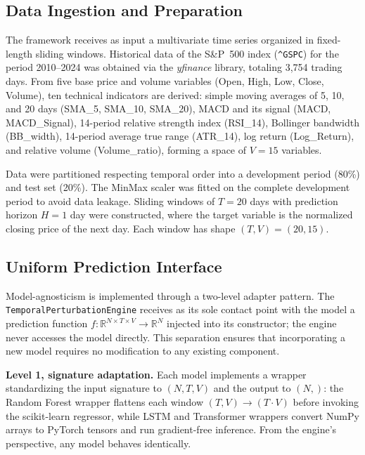 \documentclass[runningheads]{llncs}
\begin{document}
\subsection{Data Ingestion and Preparation}

The framework receives as input a multivariate time series
organized in fixed-length sliding windows. Historical data of the
S\&P~500 index (\texttt{\^{}GSPC}) for the period 2010--2024 was
obtained via the \textit{yfinance} library, totaling 3,754 trading
days. From five base price and volume variables (Open, High, Low,
Close, Volume), ten technical indicators are derived: simple moving
averages of 5, 10, and 20 days (SMA\_5, SMA\_10, SMA\_20), MACD
and its signal (MACD, MACD\_Signal), 14-period relative strength
index (RSI\_14), Bollinger bandwidth (BB\_width), 14-period average
true range (ATR\_14), log return (Log\_Return), and relative volume
(Volume\_ratio), forming a space of $V=15$ variables.

Data were partitioned respecting temporal order into a development
period (80\%) and test set (20\%). The MinMax scaler was fitted on
the complete development period to avoid data leakage. Sliding
windows of $T=20$ days with prediction horizon $H=1$ day were
constructed, where the target variable is the normalized closing
price of the next day. Each window has shape $(T, V) = (20, 15)$.

\subsection{Uniform Prediction Interface}

Model-agnosticism is implemented through a two-level adapter pattern.
The \texttt{TemporalPerturbationEngine} receives as its sole contact
point with the model a prediction function
$f: \mathbb{R}^{N \times T \times V} \rightarrow \mathbb{R}^N$
injected into its constructor; the engine never accesses the model
directly. This separation ensures that incorporating a new model
requires no modification to any existing component.

\textbf{Level 1, signature adaptation.} Each model implements a
wrapper standardizing the input signature to $(N, T, V)$ and the
output to $(N,)$: the Random Forest wrapper flattens each window
$(T,V) \rightarrow (T{\cdot}V)$ before invoking the scikit-learn
regressor, while LSTM and Transformer wrappers convert NumPy arrays
to PyTorch tensors and run gradient-free inference. From the
engine's perspective, any model behaves identically.
\end{document}
